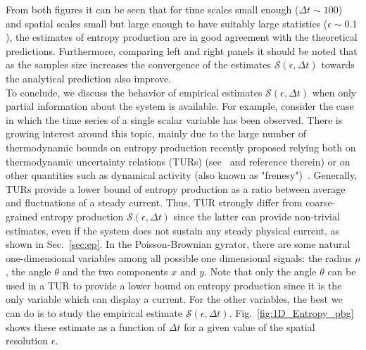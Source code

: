 \documentclass[12pt]{iopart}
\newcommand{\eps} {\epsilon}
\newcommand{\cS} {\mathcal{S}}
\begin{document}
From both figures it can be seen that for time scales small enough ($\Delta t \sim 100$) and spatial scales small but large enough to have suitably large statistics ($\eps\sim 0.1$), the estimates of entropy production are in good agreement with the theoretical predictions. Furthermore, comparing left and right panels it should be noted that as the samples size increases the convergence of the estimates $\cS(\eps,\Delta t)$ towards the analytical prediction also improve. \\
To conclude, we discuss the behavior of empirical estimates $\cS(\eps,\Delta t)$ when only partial information about the system is available. For example, consider the case in which the time series of a single scalar variable has been observed. %
There is growing interest around this topic, mainly due to the large number of thermodynamic bounds on entropy production recently proposed relying both on thermodynamic uncertainty relations (TURs) (see~\cite{barato2015thermodynamic,seifert2018stochastic,plati2023thermodynamic,di2023variance} and reference therein) or on other quantities such as dynamical activity (also known as "frenesy")~\cite{maes17,terlizzi18}.
Generally, TURs provide a lower bound of entropy production as a ratio between average and fluctuations of a steady current. Thus, TUR strongly differ from coarse-grained entropy production $\cS(\eps,\Delta t)$ since the latter can provide non-trivial estimates, even if the system does not sustain any steady physical current, as shown in Sec.~\ref{sec:ep}. In the Poisson-Brownian gyrator, there are some natural one-dimensional variables among all possible one dimensional signals: the radius $\rho$, the angle $\theta$ and the two components $x$ and $y$. Note that only the angle $\theta$ can be used in a TUR to provide a lower bound on entropy production since it is the only variable which can display a current. For the other variables, the best we can do is to study the empirical estimate $\cS(\eps,\Delta t)$. Fig.~\ref{fig:1D_Entropy_pbg} shows these estimate as a function of $\Delta t$ for a given value of the spatial resolution $\epsilon$. 
\end{document}
